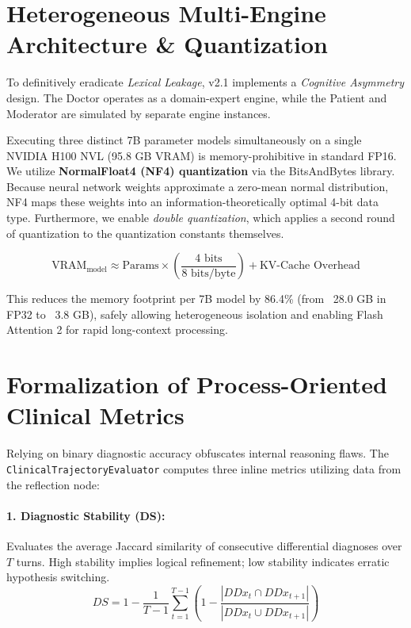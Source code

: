 \documentclass[12pt, a4paper, twoside]{report}
\begin{document}
\section{Heterogeneous Multi-Engine Architecture \& Quantization}
To definitively eradicate \textit{Lexical Leakage}, v2.1 implements a \textit{Cognitive Asymmetry} design. The Doctor operates as a domain-expert engine, while the Patient and Moderator are simulated by separate engine instances. 

Executing three distinct 7B parameter models simultaneously on a single NVIDIA H100 NVL (95.8 GB VRAM) is memory-prohibitive in standard FP16. We utilize \textbf{NormalFloat4 (NF4) quantization} via the BitsAndBytes library. Because neural network weights approximate a zero-mean normal distribution, NF4 maps these weights into an information-theoretically optimal 4-bit data type. Furthermore, we enable \textit{double quantization}, which applies a second round of quantization to the quantization constants themselves.

\begin{equation}
\text{VRAM}_{\text{model}} \approx \text{Params} \times \left( \frac{4 \text{ bits}}{8 \text{ bits/byte}} \right) + \text{KV-Cache Overhead}
\end{equation}

This reduces the memory footprint per 7B model by 86.4\% (from ~28.0 GB in FP32 to ~3.8 GB), safely allowing heterogeneous isolation and enabling Flash Attention 2 for rapid long-context processing.

\section{Formalization of Process-Oriented Clinical Metrics}
Relying on binary diagnostic accuracy obfuscates internal reasoning flaws. The \texttt{ClinicalTrajectoryEvaluator} computes three inline metrics utilizing data from the reflection node:

\paragraph{1. Diagnostic Stability (DS):} Evaluates the average Jaccard similarity of consecutive differential diagnoses over $T$ turns. High stability implies logical refinement; low stability indicates erratic hypothesis switching.
\begin{equation}
DS = 1 - \frac{1}{T - 1} \sum_{t=1}^{T-1} \left( 1 - \frac{|DDx_t \cap DDx_{t+1}|}{|DDx_t \cup DDx_{t+1}|} \right)
\end{equation}
\end{document}
